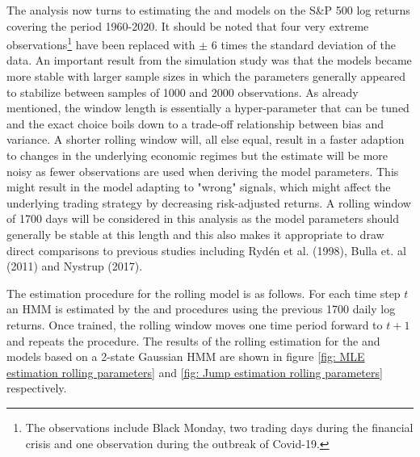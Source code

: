 The analysis now turns to estimating the \mle and \jump models on the S\&P 500 log returns covering the period 1960-2020. It should be noted that four very extreme observations\footnote{The observations include Black Monday, two trading days during the financial crisis and one observation during the outbreak of Covid-19.}
have been replaced with $\pm$ 6 times the standard deviation of the data. An important result from the simulation study was that the models became more stable with larger sample sizes in which the parameters generally appeared to stabilize between samples of 1000 and 2000 observations. As already mentioned, the window length is essentially a hyper-parameter that can be tuned and the exact choice boils down to a trade-off relationship between bias and variance. A shorter rolling window will, all else equal, result in a faster adaption to changes in the underlying economic regimes but the estimate will be more noisy as fewer observations are used when deriving the model parameters. This might result in the model adapting to "wrong" signals, which might affect the underlying trading strategy by decreasing risk-adjusted returns. A rolling window of 1700 days will be considered in this analysis as the model parameters should generally be stable at this length and this also makes it appropriate to draw direct comparisons to previous studies including Rydén et al. (1998), Bulla et. al (2011) and Nystrup (2017).

The estimation procedure for the rolling model is as follows. For each time step $t$ an HMM is estimated by the \mle and \jump procedures using the previous 1700 daily log returns. Once trained, the rolling window moves one time period forward to $t+1$ and repeats the procedure. The results of the rolling estimation for the \mle and \jump models based on a 2-state Gaussian HMM are shown in figure \ref{fig: MLE estimation rolling parameters} and \ref{fig: Jump estimation rolling parameters} respectively.

